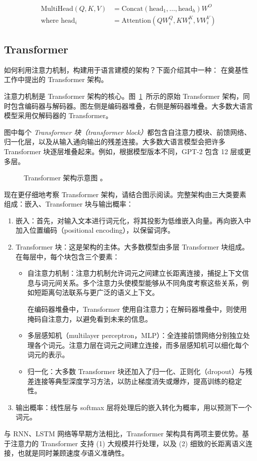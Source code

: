 \begin{align}
    \label{eq:multi-head-attention}
    \text{MultiHead}(Q, K, V) &= \text{Concat}(\text{head}_1, \dots, \text{head}_h)W^O \\
    \nonumber \text{where } \text{head}_i &= \text{Attention}(QW_i^Q, KW_i^K, VW_i^V)
\end{align}

\subsection{Transformer}
如何利用注意力机制，构建用于语言建模的架构？下面介绍其中一种：\citet{vaswani2017attention} 在奠基性工作中提出的 Transformer 架构。

注意力机制是 Transformer 架构的核心。图~\ref{fig:transformer}~所示的原始 Transformer 架构，同时包含编码器与解码器。图左侧是编码器堆叠，右侧是解码器堆叠。大多数大语言模型采用仅解码器的 Transformer。

图中每个 {\em Transformer 块（transformer block）}都包含自注意力模块、前馈网络、归一化层，以及从输入通向输出的残差连接。大多数大语言模型会把许多 Transformer 块逐层堆叠起来。例如，根据模型版本不同，GPT-2 包含 12 层或更多层。

\begin{figure}[tb]
    \centering
    
    \caption{Transformer 架构示意图 \citep{godoy_dl_visuals,vaswani2017attention}。}
    \label{fig:transformer}
\end{figure}

现在更仔细地考察 Transformer 架构，请结合图示阅读。完整架构由三大类要素组成：嵌入、Transformer 块与输出概率：
\begin{enumerate}
    \item 嵌入：首先，对输入文本进行词元化，将其投影为低维嵌入向量。再向嵌入中加入位置编码（positional encoding），以保留词序。
    \item Transformer 块：这是架构的主体。大多数模型由多层 Transformer 块组成。在每层中，每个块包含三个要素：
    \begin{itemize}
        \item 自注意力机制：注意力机制允许词元之间建立长距离连接，捕捉上下文信息与词元间关系。多个注意力头使模型能够从不同角度考察这些关系，例如短距离句法联系与更广泛的语义上下文。

        在编码器堆叠中，Transformer 使用自注意力；在解码器堆叠中，则使用掩码自注意力，以避免看到未来的信息。
        \item 多层感知机（multilayer perceptron，MLP）：全连接前馈网络分别独立处理各个词元。注意力层在词元之间建立连接，而多层感知机可以细化每个词元的表示。
        \item 归一化：大多数 Transformer 块还加入了归一化、正则化（dropout）与残差连接等典型深度学习方法，以防止梯度消失或爆炸，提高训练的稳定性。
    \end{itemize}
    \item 输出概率：线性层与 softmax 层将处理后的嵌入转化为概率，用以预测下一个词元。
\end{enumerate}
与 RNN、LSTM 网络等早期方法相比，Transformer 架构具有两项主要优势。基于注意力的 Transformer 支持 (1) 大规模并行处理，以及 (2) 细致的长距离语义连接，也就是同时兼顾速度{\em 与}语义准确性。


